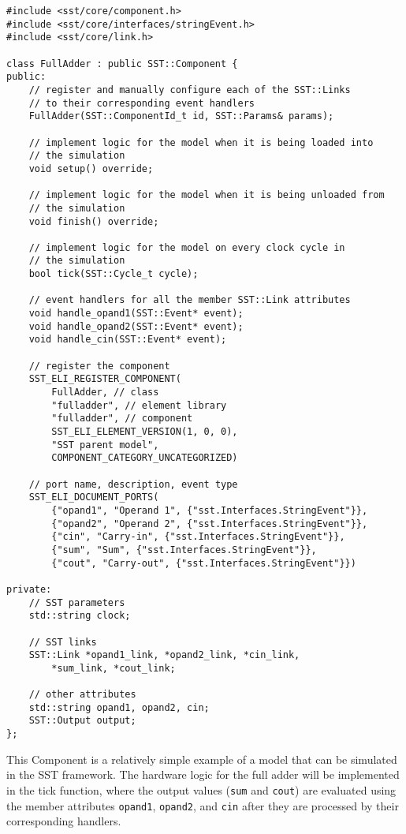 \begin{lstlisting}[style=customC++]
#include <sst/core/component.h>
#include <sst/core/interfaces/stringEvent.h>
#include <sst/core/link.h>

class FullAdder : public SST::Component {
public:
    // register and manually configure each of the SST::Links
    // to their corresponding event handlers
    FullAdder(SST::ComponentId_t id, SST::Params& params);

    // implement logic for the model when it is being loaded into
    // the simulation
    void setup() override;

    // implement logic for the model when it is being unloaded from
    // the simulation
    void finish() override;

    // implement logic for the model on every clock cycle in
    // the simulation
    bool tick(SST::Cycle_t cycle);

    // event handlers for all the member SST::Link attributes
    void handle_opand1(SST::Event* event);
    void handle_opand2(SST::Event* event);
    void handle_cin(SST::Event* event);

    // register the component
    SST_ELI_REGISTER_COMPONENT(
        FullAdder, // class
        "fulladder", // element library
        "fulladder", // component
        SST_ELI_ELEMENT_VERSION(1, 0, 0),
        "SST parent model",
        COMPONENT_CATEGORY_UNCATEGORIZED)

    // port name, description, event type
    SST_ELI_DOCUMENT_PORTS(
        {"opand1", "Operand 1", {"sst.Interfaces.StringEvent"}},
        {"opand2", "Operand 2", {"sst.Interfaces.StringEvent"}},
        {"cin", "Carry-in", {"sst.Interfaces.StringEvent"}},
        {"sum", "Sum", {"sst.Interfaces.StringEvent"}},
        {"cout", "Carry-out", {"sst.Interfaces.StringEvent"}})

private:
    // SST parameters
    std::string clock;

    // SST links
    SST::Link *opand1_link, *opand2_link, *cin_link, 
        *sum_link, *cout_link;

    // other attributes
    std::string opand1, opand2, cin;
    SST::Output output;
};
\end{lstlisting}

This Component is a relatively simple example of a model that can be simulated in the SST framework. The hardware logic for the full adder will be implemented in the tick function, where the output values (\texttt{sum} and \texttt{cout}) are evaluated using the member attributes \texttt{opand1}, \texttt{opand2}, and \texttt{cin} after they are processed by their corresponding handlers.

